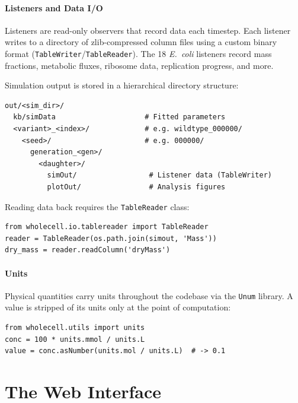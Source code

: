 \documentclass[11pt,a4paper]{article}
\begin{document}
\subsection{Listeners and Data I/O}

Listeners are read-only observers that record data each timestep.  Each listener
writes to a directory of zlib-compressed column files using a custom binary
format (\texttt{TableWriter}/\texttt{TableReader}).  The 18 \textit{E.~coli}
listeners record mass fractions, metabolic fluxes, ribosome data, replication
progress, and more.

Simulation output is stored in a hierarchical directory structure:

\begin{Verbatim}[fontsize=\small]
out/<sim_dir>/
  kb/simData                     # Fitted parameters
  <variant>_<index>/             # e.g. wildtype_000000/
    <seed>/                      # e.g. 000000/
      generation_<gen>/
        <daughter>/
          simOut/                 # Listener data (TableWriter)
          plotOut/                # Analysis figures
\end{Verbatim}

Reading data back requires the \texttt{TableReader} class:

\begin{lstlisting}
from wholecell.io.tablereader import TableReader
reader = TableReader(os.path.join(simout, 'Mass'))
dry_mass = reader.readColumn('dryMass')
\end{lstlisting}

\subsection{Units}

Physical quantities carry units throughout the codebase via the \texttt{Unum}
library.  A value is stripped of its units only at the point of computation:

\begin{lstlisting}
from wholecell.utils import units
conc = 100 * units.mmol / units.L
value = conc.asNumber(units.mol / units.L)  # -> 0.1
\end{lstlisting}


\part{The Web Interface}
\end{document}
